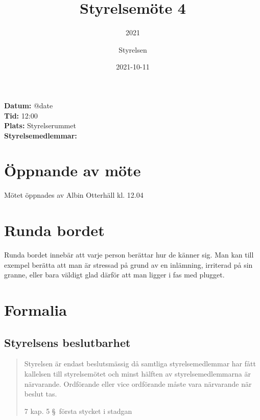 \documentclass[protokoll]{dvd}
\begin{document}
\title{Styrelsemöte 4}
\subtitle{2021}
\author{Styrelsen}
\date{2021-10-11}

\textbf{Datum:} \csname @date\endcsname\\
\textbf{Tid:} 12:00\\
\textbf{Plats:} Styrelserummet\\
\textbf{Styrelsemedlemmar:}
\begin{närvarande_förtroendevalda}
\end{närvarande_förtroendevalda}







\section{Öppnande av möte}

Mötet öppnades av Albin Otterhäll kl. 12.04






\section{Runda bordet}

Runda bordet innebär att varje person berättar hur de känner sig.
Man kan till exempel berätta att man är stressad på grund av en inlämning, irriterad på sin granne, eller bara väldigt glad därför att man ligger i fas med plugget.








\section{Formalia}

\subsection{Styrelsens beslutbarhet}

\blockquote[7 kap. 5 \S~första stycket i stadgan][]{%
    Styrelsen är endast beslutsmässig då samtliga styrelsemedlemmar har fått kallelsen till styrelsemötet och minst hälften av styrelsemedlemmarna är närvarande.
    Ordförande eller vice ordförande måste vara närvarande när beslut tas.
}
\end{document}
